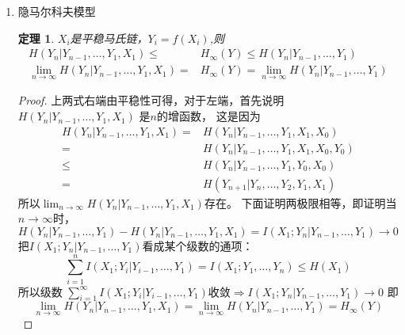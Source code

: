 \documentclass{article}
\newtheorem{thm}{定理}
\newtheorem{eg}{例}
\begin{document}
\begin{enumerate}
\begin{enumerate}[label=(\alph*)]
\begin{eg}
考虑一个两状态的马氏链，转移概率矩阵为
$
\begin{bmatrix}
1-\alpha & \alpha \\
\beta & 1-\beta
\end{bmatrix}
$
解下面的方程
$$
[\pi_1,\pi_2]=[\pi_1,\pi_2]\begin{bmatrix}
1-\alpha & \alpha \\
\beta & 1-\beta
\end{bmatrix}
$$
得
\begin{align*}
\pi_1 = & \frac{\beta}{\alpha+\beta} \\
\pi_2 = & \frac{\alpha}{\alpha+\beta}
\end{align*}
假设两状态分别为1和2，则$H(X_2|X_1=1)=-(1-\alpha)\log(1-\alpha)-\alpha\log\alpha=h(\alpha)$
同理$H(X_2|X_1=2)=h(\beta)$，因此对两状态的马氏链，熵率为$\pi_1 h(\alpha)+\pi_2 h(\beta)$
\end{eg}
\item 隐马尔科夫模型
\begin{thm}
$X_i$是平稳马氏链，$Y_i=f(X_i)$,则
\begin{align}
H(Y_n|Y_{n-1},\dots,Y_1,X_1) \leq & H_{\infty}(Y) \leq H(Y_n|Y_{n-1},\dots,Y_1) \label{eq:ineqH}\\
\lim_{n\to \infty} H(Y_n | Y_{n-1},\dots,Y_1,X_1) = & H_{\infty}(Y) = \lim_{n\to\infty} H(Y_n|Y_{n-1},\dots,Y_1) 
\end{align}
\end{thm}
\begin{proof}
上两式右端由平稳性可得，对于左端，首先说明$H(Y_n|Y_{n-1},\dots,Y_1,X_1)$ 是$n$的增函数，
这是因为
\begin{align*}
H(Y_n|Y_{n-1},\dots,Y_1,X_1) = & H(Y_n | Y_{n-1},\dots,Y_1,X_1,X_0) \\
= & H(Y_n | Y_{n-1},\dots,Y_1,X_1,X_0,Y_0)\\
\leq & H(Y_n | Y_{n-1},\dots,Y_1,Y_0,X_0) \\
= & H(Y_{n+1}|Y_n ,\dots, Y_2,Y_1,X_1)
\end{align*}
所以$\lim_{n\to \infty}H(Y_n|Y_{n-1},\dots,Y_1,X_1)$存在。
下面证明两极限相等，即证明当$n\to\infty$时，$H(Y_n|Y_{n-1},\dots,Y_1)-H(Y_n|Y_{n-1},\dots,Y_1,X_1)=I(X_1;Y_n|Y_{n-1},\dots,Y_1)\to 0$
把$I(X_1;Y_n|Y_{n-1},\dots,Y_1)$看成某个级数的通项：
$$
\sum_{i=1}^n I(X_1;Y_i|Y_{i-1},\dots,Y_1) = I(X_1;Y_1,\dots,Y_n)\leq H(X_1)
$$   
所以级数 $\sum_{i=1}^{\infty} I(X_1;Y_i|Y_{i-1},\dots,Y_1)$收敛$\Rightarrow I(X_1;Y_n|Y_{n-1},\dots,Y_1)\to 0$
即
$$
\lim_{n\to\infty}H(Y_n|Y_{n-1},\dots,Y_1,X_1)=\lim_{n\to\infty}H(Y_n|Y_{n-1},\dots,Y_1)=H_{\infty}(Y)
$$
\end{proof}
\end{enumerate}
\end{enumerate}
\end{document}
